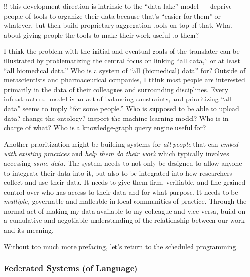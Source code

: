 \documentclass[10pt]{article}
\begin{document}
\begin{multicols}{2}
!! this development direction is intrinsic to the ``data lake'' model
--- deprive people of tools to organize their data because that's
``easier for them'' or whatever, but then build proprietary aggregation
tools on top of that. What about giving people the tools to make their
work useful to them?

I think the problem with the initial and eventual goals of the
translater can be illustrated by problematizing the central focus on
linking ``all data,'' or at least ``all biomedical data.'' Who is a
system of ``all (biomedical) data'' for? Outside of metascientists and
pharmaceutical companies, I think most people are interested primarily
in the data of their colleagues and surrounding disciplines. Every
infrastructural model is an act of balancing constraints, and
prioritizing ``all data'' seems to imply ``for some people.'' Who is
supposed to be able to upload data? change the ontology? inspect the
machine learning model? Who is in charge of what? Who is a
knowledge-graph query engine useful for?

Another prioritization might be building systems for \emph{all people}
that can \emph{embed with existing practices} and \emph{help them do
their work} which typically involves accessing \emph{some data.} The
system needs to not only be designed to allow anyone to integrate their
data into it, but also to be integrated into how researchers collect and
use their data. It needs to give them firm, verifiable, and fine-grained
control over who has access to their data and for what purpose. It needs
to be \emph{multiple,} governable and malleable in local communities of
practice. Through the normal act of making my data available to my
colleague and vice versa, build on a cumulative and negotiable
understanding of the relationship between our work and its meaning.

Without too much more prefacing, let's return to the scheduled
programming. 
\end{multicols}


\hypertarget{federated-systems-of-language}{%
\subsubsection{Federated Systems (of
Language)}\label{federated-systems-of-language}}
\end{document}
